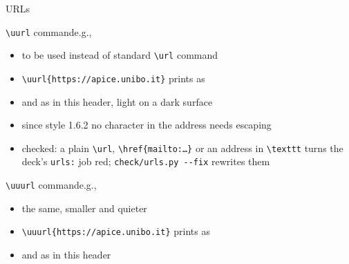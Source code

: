 \begin{frame}[c,fragile]{URLs}
%
\begin{block}{\texttt{\textbackslash{}uurl} command\textemdash{}e.g., }
\begin{itemize}
	\item to be used instead of standard \texttt{\textbackslash{}url} command
	\item[e.g.] \verb|| prints as \uurl{https://apice.unibo.it}
	\item[] and as in this header, light on a dark surface
	\item since style 1.6.2 no character in the address needs escaping
	\item checked: a plain \texttt{\textbackslash{}url}, \texttt{\textbackslash{}href\{mailto:\ldots\}} or an address in \texttt{\textbackslash{}texttt} turns the deck's \texttt{urls:} job red; \texttt{check/urls.py -{}-fix} rewrites them
\end{itemize}
\end{block}
%
\begin{block}{\texttt{\textbackslash{}uuurl} command\textemdash{}e.g., }
\begin{itemize}
	\item the same, smaller and quieter
	\item[e.g.] \verb|| prints as \uuurl{https://apice.unibo.it}
	\item[] and as in this header
\end{itemize}
\end{block}
%
\end{frame}
